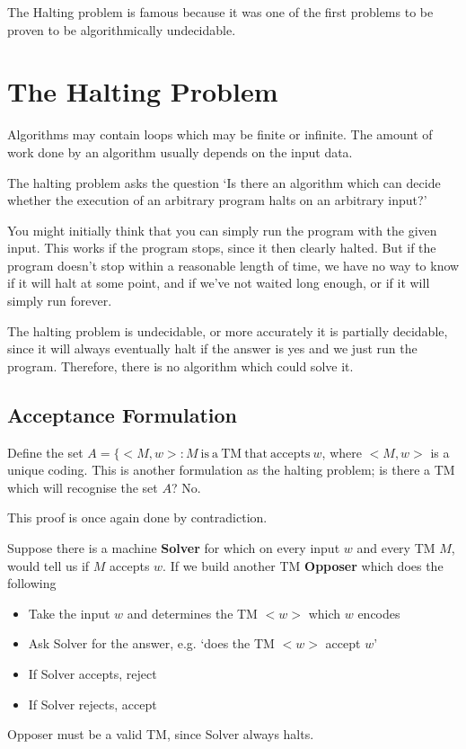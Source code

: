 The Halting problem is famous because it was one of the first problems to be proven to be algorithmically undecidable.




\section*{The Halting Problem}

Algorithms may contain loops which may be finite or infinite. The amount of work done by an algorithm usually depends
 on the input data.

The halting problem asks the question `Is there an algorithm which can decide whether the execution of an arbitrary
 program halts on an arbitrary input?'

You might initially think that you can simply run the program with the given input. This works if the program stops,
 since it then clearly halted. But if the program doesn't stop within a reasonable length of time, we have no way to
 know if it will halt at some point, and if we've not waited long enough, or if it will simply run forever.

The halting problem is undecidable, or more accurately it is partially decidable, since it will always eventually halt
 if the answer is yes and we just run the program. Therefore, there is no algorithm which could solve it.

\subsection*{Acceptance Formulation}

Define the set $A = \{<M, w> : M \mathrm{\ is\ a\ TM\ that\ accepts\ } w$, where $<M, w>$ is a unique coding. This is
 another formulation as the halting problem; is there a TM which will recognise the set $A$? No.

This proof is once again done by contradiction.

Suppose there is a machine \textbf{Solver} for which on every input $w$ and every TM $M$, would tell us if $M$ accepts
 $w$. If we build another TM \textbf{Opposer} which does the following
\begin{itemize}
  \item Take the input $w$ and determines the TM $<w>$ which $w$ encodes
  \item Ask Solver for the answer, e.g. `does the TM $<w>$ accept $w$'
  \item If Solver accepts, reject
  \item If Solver rejects, accept
\end{itemize}
Opposer must be a valid TM, since Solver always halts.

